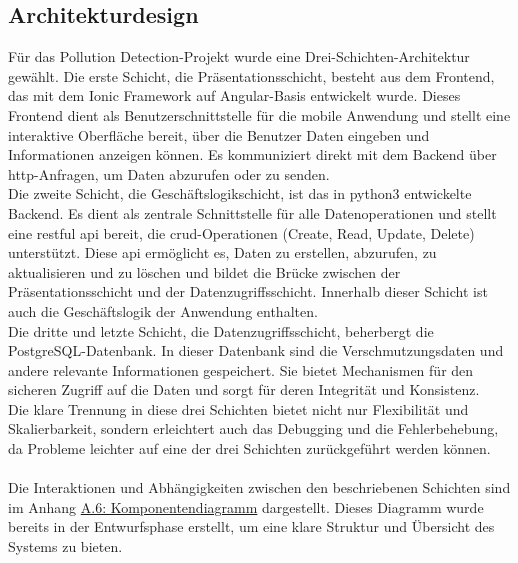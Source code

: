 \documentclass[a4paper,12pt]{article}
\begin{document}
\subsection{Architekturdesign}
\label{sec:architekturdesign}
Für das \glqq Pollution Detection\grqq{}-Projekt wurde eine Drei-Schichten-Architektur gewählt. Die erste Schicht, die Präsentationsschicht, besteht aus dem Frontend, das mit dem Ionic Framework auf Angular-Basis entwickelt wurde. Dieses Frontend dient als Benutzerschnittstelle für die mobile Anwendung und stellt eine interaktive Oberfläche bereit, über die Benutzer Daten eingeben und Informationen anzeigen können. Es kommuniziert direkt mit dem Backend über \acrshort{http}-Anfragen, um Daten abzurufen oder zu senden.\\
Die zweite Schicht, die Geschäftslogikschicht, ist das in \acrshort{python3} entwickelte Backend. Es dient als zentrale Schnittstelle für alle Datenoperationen und stellt eine \acrshort{restful} \acrshort{api} bereit, die \acrshort{crud}-Operationen (Create, Read, Update, Delete) unterstützt. Diese \acrshort{api} ermöglicht es, Daten zu erstellen, abzurufen, zu aktualisieren und zu löschen und bildet die Brücke zwischen der Präsentationsschicht und der Datenzugriffsschicht. Innerhalb dieser Schicht ist auch die Geschäftslogik der Anwendung enthalten.\\
Die dritte und letzte Schicht, die Datenzugriffsschicht, beherbergt die PostgreSQL-Datenbank. In dieser Datenbank sind die Verschmutzungsdaten und andere relevante Informationen gespeichert. Sie bietet Mechanismen für den sicheren Zugriff auf die Daten und sorgt für deren Integrität und Konsistenz.\\
Die klare Trennung in diese drei Schichten bietet nicht nur Flexibilität und Skalierbarkeit, sondern erleichtert auch das Debugging und die Fehlerbehebung, da Probleme leichter auf eine der drei Schichten zurückgeführt werden können.\\
\\
Die Interaktionen und Abhängigkeiten zwischen den beschriebenen Schichten sind im Anhang \hyperref[sec:komponentendiagramm]{A.6: Komponentendiagramm} dargestellt. Dieses Diagramm wurde bereits in der Entwurfsphase erstellt, um eine klare Struktur und Übersicht des Systems zu bieten.
\end{document}
